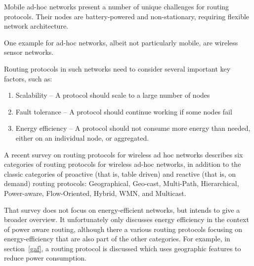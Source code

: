Mobile ad-hoc networks present a number of unique challenges for routing protocols.
Their nodes are battery-powered and non-stationary, requiring flexible network architecture.

One example for ad-hoc networks, albeit not particularly mobile, are wireless sensor networks.

Routing protocols in such networks need to consider several important key
factors, such as:
\begin{enumerate}
   \item Scalability -- A protocol should scale to a large number of nodes
   \item Fault tolerance -- A protocol should continue working if some nodes fail
   \item Energy efficiency -- A protocol should not consume more energy than needed,
   either on an individual node, or aggregated.
\end{enumerate}

A recent survey\cite{alotaibi2012survey} on routing protocols for wireless
ad hoc networks describes six categories of routing protocols for wireless
ad-hoc networks,  in addition to the classic categories of proactive (that is, table driven)
and reactive (that is, on demand) routing protocols:
  Geographical, Geo-cast, Multi-Path, Hierarchical, Power-aware, Flow-Oriented,
  Hybrid, WMN, and Multicast.

That survey does not focus on energy-efficient networks, but intends to give
a broader overview. It unfortunately only discusses energy efficiency in the
context of power aware routing, although there a various routing protocols
focusing on energy-efficiency that are also part of the other categories.
For example, in section~\ref{gaf}, a routing protocol is discussed which
uses geographic features to reduce power consumption.
